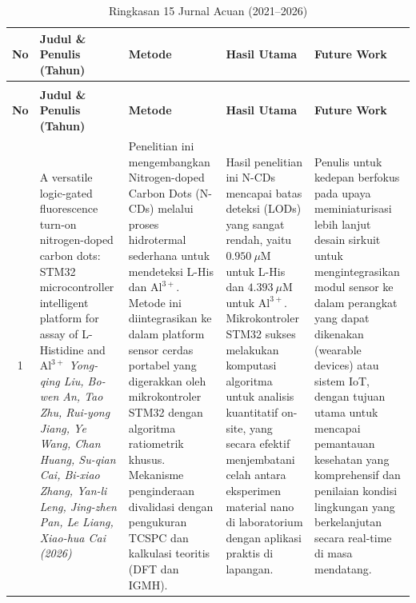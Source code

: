 \documentclass[11pt,a4paper]{article}
\begin{document}
\begin{small}
\begin{longtable}{|c|>{\raggedright\arraybackslash}p{3.2cm}|>{\raggedright\arraybackslash}p{4cm}|>{\raggedright\arraybackslash}p{4cm}|>{\raggedright\arraybackslash}p{4cm}|}
\caption{Ringkasan 15 Jurnal Acuan (2021--2026)} \label{tab:literatur} \\
\hline
\textbf{No} & \textbf{Judul \& Penulis (Tahun)} & \textbf{Metode} & \textbf{Hasil Utama} & \textbf{Future Work} \\
\hline
\endfirsthead
\caption[]{Ringkasan 15 Jurnal Acuan (2021--2026)} \\
\hline
\textbf{No} & \textbf{Judul \& Penulis (Tahun)} & \textbf{Metode} & \textbf{Hasil Utama} & \textbf{Future Work} \\
\hline
\endhead
\hline
\endfoot


1 & A versatile logic-gated fluorescence turn-on nitrogen-doped carbon dots: STM32 microcontroller intelligent platform for assay of L-Histidine and $\text{Al}^{3+}$ \newline \newline \textit{Yong-qing Liu, Bo-wen An, Tao Zhu, Rui-yong Jiang, Ye Wang, Chan Huang, Su-qian Cai, Bi-xiao Zhang, Yan-li Leng, Jing-zhen Pan, Le Liang, Xiao-hua Cai (2026)} & Penelitian ini mengembangkan Nitrogen-doped Carbon Dots (N-CDs) melalui proses hidrotermal sederhana untuk mendeteksi L-His dan $\text{Al}^{3+}$. Metode ini diintegrasikan ke dalam platform sensor cerdas portabel yang digerakkan oleh mikrokontroler STM32 dengan algoritma ratiometrik khusus. Mekanisme penginderaan divalidasi dengan pengukuran TCSPC dan kalkulasi teoritis (DFT dan IGMH). & Hasil penelitian ini N-CDs mencapai batas deteksi (LODs) yang sangat rendah, yaitu $0.950\ \mu\text{M}$ untuk L-His dan $4.393\ \mu\text{M}$ untuk $\text{Al}^{3+}$. Mikrokontroler STM32 sukses melakukan komputasi algoritma untuk analisis kuantitatif on-site, yang secara efektif menjembatani celah antara eksperimen material nano di laboratorium dengan aplikasi praktis di lapangan. & Penulis untuk kedepan berfokus pada upaya meminiaturisasi lebih lanjut desain sirkuit untuk mengintegrasikan modul sensor ke dalam perangkat yang dapat dikenakan (wearable devices) atau sistem IoT, dengan tujuan utama untuk mencapai pemantauan kesehatan yang komprehensif dan penilaian kondisi lingkungan yang berkelanjutan secara real-time di masa mendatang. \\


\end{longtable}
\end{small}
\end{document}
